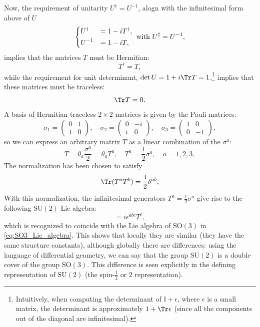 Now, the requirement of unitarity \(U^{\dagger} = U^{-1}\), alogn with the infinitesimal form above of \(U\)
\[
    \begin{dcases}
        U^\dagger & = 1 - i T^\dagger, \\
        U^{-1}    & = 1 - i T,
    \end{dcases} \text{ with } U^\dagger = U^{-1},
\]
implies that the matrices $T$ must be Hermitian:
\[
    T^\dagger = T,
\]
while the requirement for unit determinant, $\det U = 1 + i \Tr T = 1$,\footnote{Intuitively, when computing the determinant of \(\mathbb{I} + \epsilon\), where \(\epsilon\) is a small matrix, the determinant is approximately \(1 + \Tr \epsilon\) (since all the components out of the diagonal are infinitesimal).} implies that these matrices must be traceless:
\[
    \Tr T = 0.
\]
A basis of Hermitian traceless $2 \times 2$ matrices is given by the Pauli matrices:
\begin{equation}
    \sigma_1 =
    \begin{pmatrix}
        0 & 1 \\
        1 & 0
    \end{pmatrix}, \quad
    \sigma_2 =
    \begin{pmatrix}
        0 & -i \\
        i & 0
    \end{pmatrix}, \quad
    \sigma_3 =
    \begin{pmatrix}
        1 & 0  \\
        0 & -1
    \end{pmatrix},
    \label{eq:Pauli_matrices}
\end{equation}
so we can express an arbitrary matrix $T$ as a linear combination of the $\sigma^a$:
\begin{equation}
    T = \theta_a \frac{\sigma^a}{2} = \theta_a T^a, \quad T^a = \frac{1}{2} \sigma^a, \quad a = 1,2,3,
    \label{eq:SU2_generators}
\end{equation}
The normalization has been chosen to satisfy
\begin{equation}
    \Tr (T^a T^b) = \frac{1}{2} \delta^{ab},
    \label{eq:SU2_generator_normalization}
\end{equation}
With this normalization, the infinitesimal generators $T^a = \frac{1}{2} \sigma^a$ give rise to the following $\mathrm{SU}(2)$ Lie algebra:
\begin{equation}
    [T^a, T^b] = i \epsilon^{abc} T^c,
    \label{eq:SU2_Lie_algebra}
\end{equation}
which is recognized to coincide with the Lie algebra of $\mathrm{SO}(3)$ in \eqref{eq:SO3_Lie_algebra}. This shows that locally they are similar (they have the same structure constants), although globally there are differences: using the language of differential geometry, we can say that the group $\mathrm{SU}(2)$ is a double cover of the group $\mathrm{SO}(3)$. This difference is seen explicitly in the defining representation of $\mathrm{SU}(2)$ (the spin-$\tfrac{1}{2}$ or $2$ representation).

